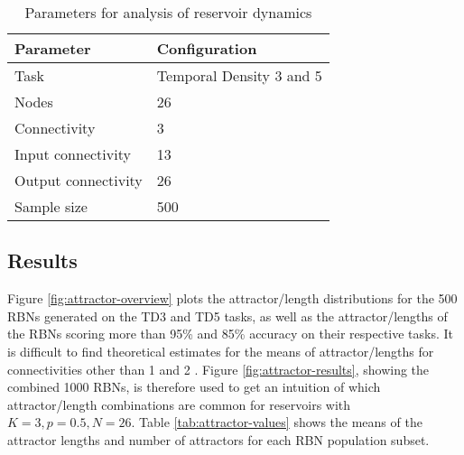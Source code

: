 \begin{table}[h]
    \centering
    \caption{Parameters for analysis of reservoir dynamics}
    \label{tab:reservoir-dynamics-parameters}
    \begin{tabular}{ll}
        \hline
        \textbf{Parameter} & \textbf{Configuration} \\
        \hline
        \hline
        Task                & Temporal Density 3 and 5  \\
        Nodes               & 26                        \\
        Connectivity        & 3                         \\
        Input connectivity  & 13                        \\
        Output connectivity & 26                        \\
        Sample size         & 500 \\
        \hline
    \end{tabular}
\end{table}

\subsection{Results}

Figure \ref{fig:attractor-overview} plots the attractor/length distributions for the 500 RBNs generated on the TD3 and TD5 tasks,
as well as the attractor/lengths of the RBNs scoring more than 95\% and 85\% accuracy on their respective tasks.
It is difficult to find theoretical estimates for the means of attractor/lengths for connectivities other than 1 \cite{drossel2005number} and 2 \cite{samuelsson2003superpolynomial}.
Figure \ref{fig:attractor-results}, showing the combined 1000 RBNs, is therefore used to get an intuition of which attractor/length combinations are common for reservoirs with $ K=3, p=0.5, N=26 $.
Table \ref{tab:attractor-values} shows the means of the attractor lengths and number of attractors for each RBN population subset.

